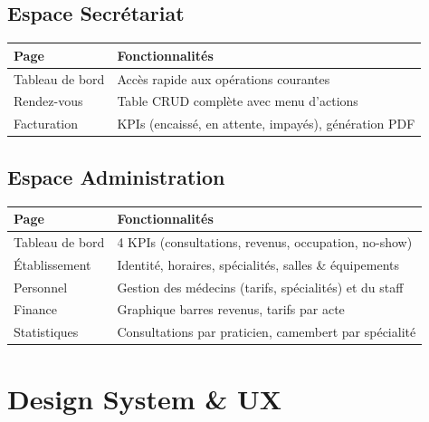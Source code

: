 \documentclass[11pt,a4paper]{article}
\begin{document}
\subsection{Espace Secrétariat}

\begin{table}[H]
\centering
\renewcommand{\arraystretch}{1.4}
\begin{tabularx}{\textwidth}{lX}
\toprule
\rowcolor{primary!10}
\textbf{Page} & \textbf{Fonctionnalités} \\
\midrule
Tableau de bord & Accès rapide aux opérations courantes \\
Rendez-vous & Table CRUD complète avec menu d'actions \\
Facturation & KPIs (encaissé, en attente, impayés), génération PDF \\
\bottomrule
\end{tabularx}
\end{table}

\subsection{Espace Administration}

\begin{table}[H]
\centering
\renewcommand{\arraystretch}{1.4}
\begin{tabularx}{\textwidth}{lX}
\toprule
\rowcolor{primary!10}
\textbf{Page} & \textbf{Fonctionnalités} \\
\midrule
Tableau de bord & 4 KPIs (consultations, revenus, occupation, no-show) \\
Établissement & Identité, horaires, spécialités, salles \& équipements \\
Personnel & Gestion des médecins (tarifs, spécialités) et du staff \\
Finance & Graphique barres revenus, tarifs par acte \\
Statistiques & Consultations par praticien, camembert par spécialité \\
\bottomrule
\end{tabularx}
\end{table}

\newpage

\section{Design System \& UX}
\end{document}
